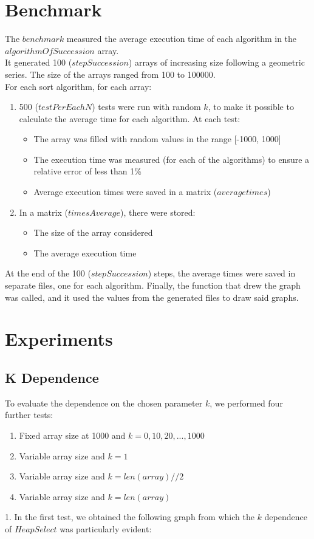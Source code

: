\documentclass{article}
\begin{document}
\section{Benchmark}
The $benchmark$ measured the average execution time of each algorithm in the $algorithmOfSuccession$ array.\\
It generated 100 ($stepSuccession$) arrays of increasing size following a geometric series. The size of the arrays ranged from 100 to 100000.\\
For each sort algorithm, for each array:
\begin{enumerate} %
    \item 500 ($testPerEachN$) tests were run with random $k$, to make it possible to calculate the average time for each algorithm. At each test: 
    \begin{itemize} %
        \item The array was filled with random values in the range [-1000, 1000]
        \item The execution time was measured (for each of the algorithms) to ensure a relative error of less than 1\%
        \item Average execution times were saved in a matrix ($averagetimes$)
    \end{itemize} %
    
    \item In a matrix ($timesAverage$), there were stored:
    \begin{itemize} %
        \item The size of the array considered
        \item The average execution time
    \end{itemize} %
    
\end{enumerate} %
At the end of the 100 ($stepSuccession$) steps, the average times were saved in separate files, one for each algorithm.
Finally, the function that drew the graph was called, and it used the values from the generated files to draw said graphs.

\section{Experiments}
\subsection{K Dependence}
To evaluate the dependence on the chosen parameter $k$, we performed four further tests:
\begin{enumerate}
    \item Fixed array size at 1000 and $k=0,10,20,...,1000$
    \item Variable array size and $k=1$
    \item Variable array size and $k=len(array)//2$
    \item Variable array size and $k=len(array)$
\end{enumerate}
1. In the first test, we obtained the following graph from which the $k$ dependence of $HeapSelect$ was particularly evident: \\
\end{document}
